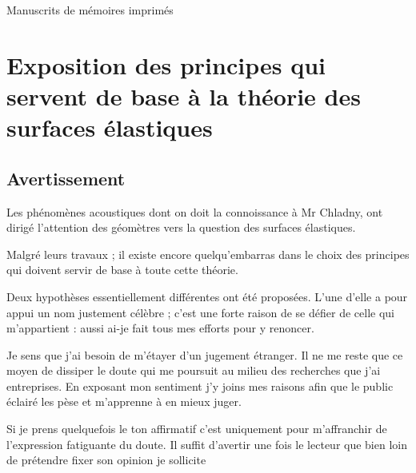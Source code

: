 \documentclass[11pt,a4paper]{article}
\begin{document}

Manuscrits de mémoires imprimés


\section{Exposition des principes qui servent de base à la théorie des surfaces élastiques}

\subsection{Avertissement}

Les phénomènes acoustiques dont on doit la connoissance à Mr Chladny, ont
dirigé l'attention des géomètres vers la question des surfaces élastiques.

Malgré leurs travaux ; il existe encore quelqu'embarras dans le choix des
principes qui doivent servir de base à toute cette théorie.

Deux hypothèses essentiellement différentes ont été proposées. L'une d'elle a
pour appui un nom justement célèbre ; c'est une forte raison de se défier de
celle qui m'appartient : aussi ai-je fait tous mes efforts pour y renoncer.

Je sens que j'ai besoin de m'étayer d'un jugement étranger. Il ne me reste que
ce moyen de dissiper le doute qui me poursuit au milieu des recherches que
j'ai entreprises. En exposant mon sentiment j'y joins mes raisons afin que le
public éclairé les pèse et m'apprenne à en mieux juger.

Si je prens quelquefois le ton affirmatif c'est uniquement pour m'affranchir
de l'expression fatiguante du doute. Il suffit d'avertir une fois le lecteur
que bien loin de prétendre fixer son opinion je sollicite
\end{document}
